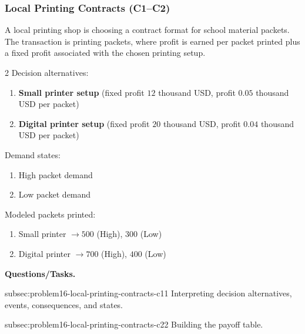 
	\subsubsection{Local Printing Contracts (C1--C2)}
	\label{sec:problem16-local-printing-contracts-c1-c2}
	A local printing shop is choosing a contract format for school material packets. The transaction is printing packets, where profit is earned per packet printed plus a fixed profit associated with the chosen printing setup.

	\begin{multicols}{2}
		Decision alternatives:
		\begin{enumerate}[label=\arabic*.]
			\item \textbf{Small printer setup} (fixed profit $12$ thousand USD, profit $0.05$ thousand USD per packet)
			\item \textbf{Digital printer setup} (fixed profit $20$ thousand USD, profit $0.04$ thousand USD per packet)
		\end{enumerate}

		Demand states:
		\begin{enumerate}[label=\arabic*.]
			\item High packet demand
			\item Low packet demand
		\end{enumerate}

			\columnbreak

		Modeled packets printed:
		\begin{enumerate}[label=\arabic*.]
			\item Small printer $\to 500$ (High), $300$ (Low)
			\item Digital printer $\to 700$ (High), $400$ (Low)
		\end{enumerate}
	\end{multicols}

	\textbf{Questions/Tasks.}
	\begin{enumerate}
		\CriterionTask
		{subsec:problem16-local-printing-contracts-c1}{1}
		{Interpreting decision alternatives, events, consequences, and states.}

		\CriterionTask
		{subsec:problem16-local-printing-contracts-c2}{2}
		{Building the payoff table.}
	\end{enumerate}

